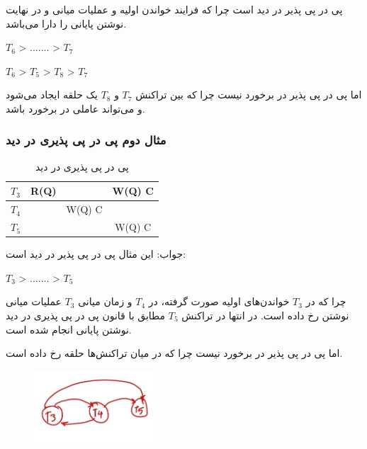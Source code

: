 \documentclass[a4paper]{article}
\begin{document}
پی در پی پذیر در دید است چرا که فرایند خواندن اولیه و عملیات میانی و در نهایت
نوشتن پایانی را دارا می‌باشد.

\begin{LTR}
    $T_{6}$ > ....... > $T_{7}$

    $T_{6}$ > $T_{5}$ > $T_{8}$ > $T_{7}$
\end{LTR}

اما پی در پی پذیر در برخورد نیست چرا که بین تراکنش $T_{7}$ و $T_{8}$ یک حلقه
ایجاد می‌شود و می‌تواند عاملی در برخورد باشد.

\newpage

\subsubsection{مثال دوم پی در پی پذیری در دید}

\begin{LTR}
    \begin{table}[h]
        \centering
        \begin{RTL}
            \caption{پی در پی پذیری در دید}
        \end{RTL}
        \begin{tabular}{c|c|c|c}
            $T_{3}$ & R(Q) & & W(Q) C \\ \hline
            $T_{4}$ & & W(Q) C &  \\ \hline
            $T_{5}$ & & & W(Q) C \\
        \end{tabular}
    \end{table}
\end{LTR}

جواب: این مثال پی در پی پذیر در دید است:

\begin{LTR}
    $T_{3}$ > ....... > $T_{5}$
\end{LTR}

چرا که در $T_{3}$ خواندن‌های اولیه صورت گرفته، در $T_{4}$ و زمان میانی $T_{3}$
عملیات میانی نوشتن رخ داده است. در انتها در تراکنش $T_{5}$ مطابق با قانون پی در
پی پذیری در دید نوشتن پایانی انجام شده است.

اما پی در پی پذیر در برخورد نیست چرا که در میان تراکنش‌ها حلقه رخ داده است.

\begin{figure}
    \centering
    \includegraphics[width=0.4\textwidth]{umls/vsr_exp_2.jpg}
\end{figure}
\end{document}
